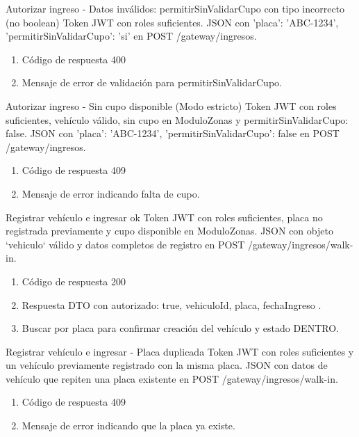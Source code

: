 {Autorizar ingreso - Datos inválidos: permitirSinValidarCupo con tipo incorrecto (no boolean)}
{Token JWT con roles suficientes.}
{JSON con { 'placa': 'ABC-1234', 'permitirSinValidarCupo': 'si' } en POST /gateway/ingresos.}
{\begin{enumerate} [leftmargin=*, nosep]
    \item Código de respuesta 400
    \item Mensaje de error de validación para permitirSinValidarCupo.
\end{enumerate}}

{Autorizar ingreso - Sin cupo disponible (Modo estricto)}
{Token JWT con roles suficientes, vehículo válido, sin cupo en ModuloZonas y permitirSinValidarCupo: false.}
{JSON con { 'placa': 'ABC-1234', 'permitirSinValidarCupo': false } en POST /gateway/ingresos.}
{\begin{enumerate} [leftmargin=*, nosep]
    \item Código de respuesta 409
    \item Mensaje de error indicando falta de cupo.
\end{enumerate}}

{Registrar vehículo e ingresar ok}
{Token JWT con roles suficientes, placa no registrada previamente y cupo disponible en ModuloZonas.}
{JSON con objeto `vehiculo` válido y datos completos de registro en POST /gateway/ingresos/walk-in.}
{\begin{enumerate} [leftmargin=*, nosep]
    \item Código de respuesta 200
    \item Respuesta DTO con { autorizado: true, vehiculoId, placa, fechaIngreso }.
    \item Buscar por placa para confirmar creación del vehículo y estado DENTRO.
\end{enumerate}}

{Registrar vehículo e ingresar - Placa duplicada}
{Token JWT con roles suficientes y un vehículo previamente registrado con la misma placa.}
{JSON con datos de vehículo que repiten una placa existente en POST /gateway/ingresos/walk-in.}
{\begin{enumerate} [leftmargin=*, nosep]
    \item Código de respuesta 409
    \item Mensaje de error indicando que la placa ya existe.
\end{enumerate}}


